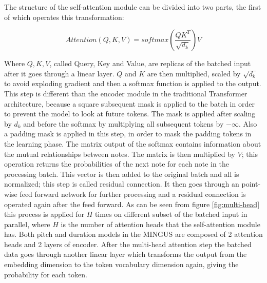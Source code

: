 \documentclass{article}
\begin{document}
The structure of the self-attention module can be divided into two parts, the first of which operates this transformation:

\[Attention(Q,K,V) = softmax(\frac{QK^T}{\sqrt{d_k}})V\]

Where $Q,K,V$, called Query, Key and Value, are replicas of the batched input after it goes through a linear layer. $Q$ and $K$ are then multiplied, scaled by $\sqrt{d_k}$ to avoid exploding gradient and then a softmax function is applied to the output. 
This step is different than the encoder module in the traditional Transformer architecture, because a square subsequent mask is applied to the batch in order to prevent the model to look at future tokens. The mask is applied after scaling by $d_k$ and before the softmax by multiplying all subsequent tokens by $- \infty$. Also a padding mask is applied in this step, in order to mask the padding tokens in the learning phase.
The matrix output of the softmax contains information about the mutual relationships between notes. The matrix is then multiplied by $V$; this operation returns the probabilities of the next note for each note in the processing batch. This vector is then added to the original batch and all is normalized; this step is called residual connection. It then goes through an point-wise feed forward network for further processing and a residual connection is operated again after the feed forward. As can be seen from figure \ref{fig:multi-head} this process is applied for $H$ times on different subset of the batched input in parallel, where $H$ is the number of attention heads that the self-attention module has. Both pitch and duration models in the MINGUS are composed of 2 attention heads and 2 layers of encoder. After the multi-head attention step the batched data goes through another linear layer which transforms the output from the embedding dimension to the token vocabulary dimension again, giving the probability for each token.
\end{document}
